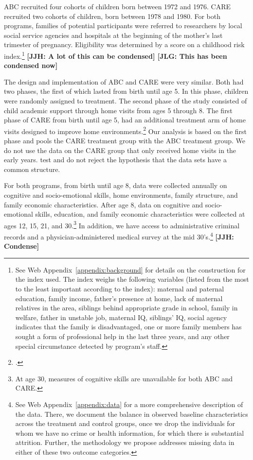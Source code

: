 ABC recruited four cohorts of children born between 1972 and 1976. CARE recruited two cohorts of children, born between 1978 and 1980. For both programs, families of potential participants were referred to researchers by local social service agencies and hospitals at the beginning of the mother's last trimester of pregnancy. Eligibility was determined by a score on a childhood risk index.\footnote{See Web Appendix~\ref{appendix:background} for details on the construction for the index used. The index weighs the following variables (listed from the most to the least important according to the index): maternal and paternal education, family income, father's presence at home, lack of maternal relatives in the area, siblings behind appropriate grade in school, family in welfare, father in unstable job, maternal IQ, siblings' IQ, social agency indicates that the family is disadvantaged, one or more family members has sought a form of professional help in the last three years, and any other special circumstance detected by program's staff.} \textbf{[JJH: A lot of this can be condensed] [JLG: This has been condensed now]}

The design and implementation of ABC and CARE were very similar. Both had two phases, the first of which lasted from birth until age 5. In this phase, children were randomly assigned to treatment. The second phase of the study consisted of child academic support through home visits from ages 5 through 8. The first phase of CARE from birth until age 5, had an additional treatment arm of home visits designed to improve home environments.\footnote{\citet{Wasik_Ramey_etal_1990_CD}.} Our analysis is based on the first phase and pools the CARE treatment group with the ABC treatment group. We do not use the data on the CARE group that only received home visits in the early years. \cite{Campbell_Conti_etal_2014_EarlyChildhoodInvestments} test and do not reject the hypothesis that the data sets have a common structure.

For both programs, from birth until age 8, data were collected annually on cognitive and socio-emotional skills, home environments, family structure, and family economic characteristics. After age 8, data on cognitive and socio-emotional skills, education, and family economic characteristics were collected at ages 12, 15, 21, and 30.\footnote{At age 30, measures of cognitive skills are unavailable for both ABC and CARE.} In addition, we have access to administrative criminal records and a physician-administered medical survey at the mid 30's.\footnote{See Web Appendix~\ref{appendix:data} for a more comprehensive description of the data. There, we document the balance in observed baseline characteristics across the treatment and control groups, once we drop the individuals for whom we have no crime or health information, for which there is substantial attrition. Further, the methodology we propose addresses missing data in either of these two outcome categories.} \textbf{[JJH: Condense]}

